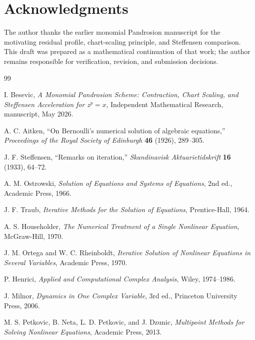 \documentclass[11pt]{article}
\theoremstyle{definition}
\begin{document}
\section*{Acknowledgments}
The author thanks the earlier monomial Pandrosion manuscript for the motivating residual profile, chart-scaling principle, and Steffensen comparison.  This draft was prepared as a mathematical continuation of that work; the author remains responsible for verification, revision, and submission decisions.

\begin{thebibliography}{99}

I. Besevic,
\emph{A Monomial Pandrosion Scheme: Contraction, Chart Scaling, and Steffensen Acceleration for $z^p=x$},
Independent Mathematical Research, manuscript, May 2026.

A. C. Aitken,
``On Bernoulli's numerical solution of algebraic equations,''
\emph{Proceedings of the Royal Society of Edinburgh} \textbf{46} (1926), 289--305.

J. F. Steffensen,
``Remarks on iteration,''
\emph{Skandinavisk Aktuarietidskrift} \textbf{16} (1933), 64--72.

A. M. Ostrowski,
\emph{Solution of Equations and Systems of Equations},
2nd ed., Academic Press, 1966.

J. F. Traub,
\emph{Iterative Methods for the Solution of Equations},
Prentice-Hall, 1964.

A. S. Householder,
\emph{The Numerical Treatment of a Single Nonlinear Equation},
McGraw-Hill, 1970.

J. M. Ortega and W. C. Rheinboldt,
\emph{Iterative Solution of Nonlinear Equations in Several Variables},
Academic Press, 1970.

P. Henrici,
\emph{Applied and Computational Complex Analysis},
Wiley, 1974--1986.

J. Milnor,
\emph{Dynamics in One Complex Variable},
3rd ed., Princeton University Press, 2006.

M. S. Petkovic, B. Neta, L. D. Petkovic, and J. Dzunic,
\emph{Multipoint Methods for Solving Nonlinear Equations},
Academic Press, 2013.

\end{thebibliography}
\end{document}
